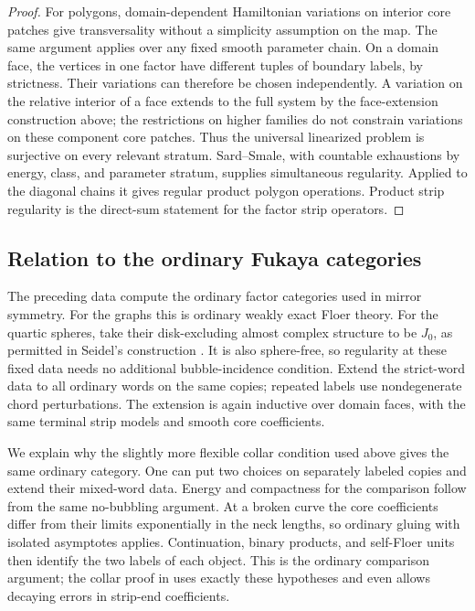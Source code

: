 \begin{proof}
For polygons, domain-dependent Hamiltonian variations on interior
core patches give transversality without a simplicity assumption on
the map.  The same argument applies over any fixed smooth parameter
chain.  On a domain face, the vertices in one factor have different
tuples of boundary labels, by strictness.  Their variations can
therefore be chosen independently.  A variation on the relative
interior of a face extends to the full system by the face-extension
construction above; the restrictions on higher families do not
constrain variations on these component core patches.  Thus the
universal linearized problem is surjective on every relevant
stratum.  Sard--Smale, with countable exhaustions by energy, class,
and parameter stratum, supplies simultaneous regularity.  Applied to
the diagonal chains it gives regular product polygon operations.
Product strip regularity is the direct-sum statement for the factor
strip operators.
\end{proof}

\subsection{Relation to the ordinary Fukaya categories}
\label{comp:ordinary}

The preceding data compute the ordinary factor categories used in
mirror symmetry.  For the graphs this is ordinary weakly exact
Floer theory.  For the quartic spheres, take their disk-excluding
almost complex structure to be $J_0$, as permitted in Seidel's
construction \cite[Section~8]{SeidelQuartic}.  It is also sphere-free,
so regularity at these fixed data needs no additional bubble-incidence
condition.  Extend the strict-word data to all ordinary words on the
same copies; repeated labels use nondegenerate chord perturbations.
The extension is again inductive over domain faces, with the same
terminal strip models and smooth core coefficients.

We explain why the slightly more flexible collar condition used
above gives the same ordinary category.  One can put two choices on
separately labeled copies and extend their mixed-word data.  Energy
and compactness for the comparison follow from the same no-bubbling
argument.  At a broken curve the core coefficients differ from their
limits exponentially in the neck lengths, so ordinary gluing with
isolated asymptotes applies.  Continuation, binary products, and
self-Floer units then identify the two labels of each object.  This
is the ordinary comparison argument; the collar proof in
\cite[Proposition~7.5]{A8} uses exactly these hypotheses and even
allows decaying errors in strip-end coefficients.

